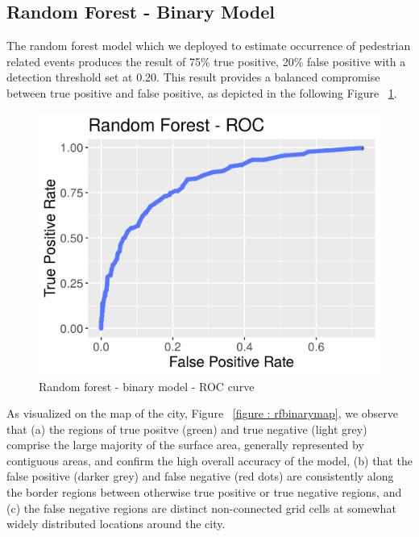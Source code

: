 \documentclass{llncs}
\begin{document}
\subsection{Random Forest - Binary Model}

The random forest model which we deployed to estimate occurrence of pedestrian related events produces the result of 75\% true positive, 20\% false positive with a detection threshold set at 0.20. This result provides a balanced compromise between true positive and false positive, as depicted in the following Figure ~\ref{figure : rfroccurve}. \newline
\FloatBarrier
\begin{figure}
 	\includegraphics[width=\textwidth, height=\textheight, keepaspectratio]{RFROC.png}
 	\caption{Random forest - binary model - ROC curve}
	\label{figure : rfroccurve}
\end{figure}
\FloatBarrier

As visualized on the map of the city, Figure ~\ref{figure : rfbinarymap}, we observe that (a) the regions of true positve (green) and true negative (light grey) comprise the large majority of the surface area, generally represented by contiguous areas, and confirm the high overall accuracy of the model, (b) that the false positive (darker grey) and false negative (red dots) are consistently along the border regions between otherwise true positive or true negative regions, and (c)  the false negative regions are distinct non-connected grid cells at somewhat widely distributed locations around the city.
\newline
\end{document}
